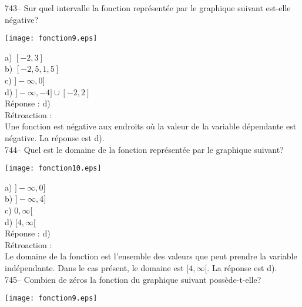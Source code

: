 ﻿\documentclass[letterpaper, 12pt]{article}
\begin{document}
743-- Sur quel intervalle la fonction repr\'esent\'ee par le graphique
suivant est-elle n\'egative?\\

    \begin{center}
    \texttt{[image: fonction9.eps]}
    \end{center}

a) $[-2, 3]$\\
b) $[-2,5, 1,5]$\\
c) $]-\infty,0]$\\
d) $]-\infty,-4]\cup[-2,2]$\\

R\'eponse : d)\\

R\'etroaction : \\
Une fonction est n\'egative aux endroits o\`u la valeur de la variable
d\'ependante est n\'egative.  La r\'eponse est d).\\

744-- Quel est le domaine de la fonction repr\'esent\'ee par le graphique
suivant?\\

    \begin{center}
    \texttt{[image: fonction10.eps]}
    \end{center}
a) $]-\infty,0]$\\
b) $]-\infty,4]$\\
c) $0,\infty[$\\
d) $[4, \infty[$\\

R\'eponse : d)\\

R\'etroaction : \\
Le domaine de la fonction est l'ensemble des valeurs que peut prendre la
variable ind\'ependante.  Dans le cas pr\'esent, le domaine est $[4,
\infty[$.  La r\'eponse est d).\\

745-- Combien de z\'eros la fonction du graphique suivant
poss\`ede-t-elle?\\
    \begin{center}
    \texttt{[image: fonction9.eps]}
    \end{center}
\end{document}
